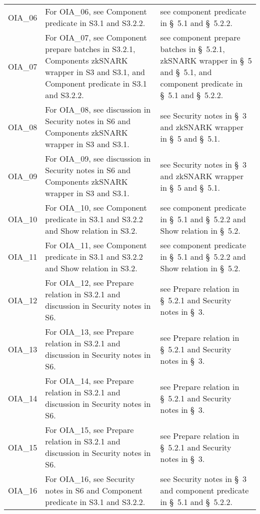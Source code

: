 \begin{landscape}
\begin{longtable}{p{3cm} p{10cm} p{7cm}}
OIA\_06 &
For OIA\_06, see Component predicate in S3.1 and S3.2.2. &
see component predicate in \S~5.1 and \S~5.2.2. \\

OIA\_07 &
For OIA\_07, see Component prepare batches in S3.2.1, Components zkSNARK wrapper in S3 and S3.1, and Component predicate in S3.1 and S3.2.2. &
see component prepare batches in \S~5.2.1, zkSNARK wrapper in \S~5 and \S~5.1, and component predicate in \S~5.1 and \S~5.2.2. \\

OIA\_08 &
For OIA\_08, see discussion in Security notes in S6 and Components zkSNARK wrapper in S3 and S3.1. &
see Security notes in \S~3 and zkSNARK wrapper in \S~5 and \S~5.1. \\

OIA\_09 &
For OIA\_09, see discussion in Security notes in S6 and Components zkSNARK wrapper in S3 and S3.1. &
see Security notes in \S~3 and zkSNARK wrapper in \S~5 and \S~5.1. \\

OIA\_10 &
For OIA\_10, see Component predicate in S3.1 and S3.2.2 and Show relation in S3.2. &
see component predicate in \S~5.1 and \S~5.2.2 and Show relation in \S~5.2. \\

OIA\_11 &
For OIA\_11, see Component predicate in S3.1 and S3.2.2 and Show relation in S3.2. &
see component predicate in \S~5.1 and \S~5.2.2 and Show relation in \S~5.2. \\

OIA\_12 &
For OIA\_12, see Prepare relation in S3.2.1 and discussion in Security notes in S6. &
see Prepare relation in \S~5.2.1 and Security notes in \S~3. \\

OIA\_13 &
For OIA\_13, see Prepare relation in S3.2.1 and discussion in Security notes in S6. &
see Prepare relation in \S~5.2.1 and Security notes in \S~3. \\

OIA\_14 &
For OIA\_14, see Prepare relation in S3.2.1 and discussion in Security notes in S6. &
see Prepare relation in \S~5.2.1 and Security notes in \S~3. \\

OIA\_15 &
For OIA\_15, see Prepare relation in S3.2.1 and discussion in Security notes in S6. &
see Prepare relation in \S~5.2.1 and Security notes in \S~3. \\

OIA\_16 &
For OIA\_16, see Security notes in S6 and Component predicate in S3.1 and S3.2.2. &
see Security notes in \S~3 and component predicate in \S~5.1 and \S~5.2.2. \\[1em]


\end{longtable}
\end{landscape}
